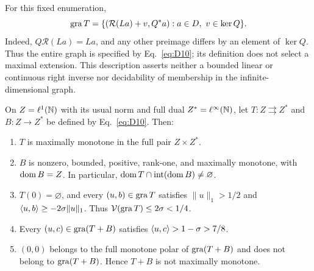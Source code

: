 For this fixed enumeration,
\[
\operatorname{gra} T=\{(\mathcal R(La)+v,Q^*a):a\in D,\ v\in\ker Q\}.
\]
Indeed, $Q\mathcal R(La)=La$, and any other preimage differs by
an element of $\ker Q$. Thus the entire graph is specified by
Eq.~\eqref{eq:D10}; its definition does not select a maximal extension.
This description asserts neither a bounded linear or continuous right
inverse nor decidability of membership in the infinite-dimensional graph.

\label{sec:l1}
\begin{example}\label{thm:L}
On $Z=\ell^1(\mathbb N)$ with its usual norm and full dual $Z^*=\ell^\infty(\mathbb N)$,
let $T:Z\rightrightarrows Z^*$ and $B:Z\to Z^*$ be defined by Eq.~\eqref{eq:D10}.
Then:
\begin{enumerate}
\item $T$ is maximally monotone in the full pair $Z\times Z^*$.
\item $B$ is nonzero, bounded, positive, rank-one, and maximally monotone,
with $\operatorname{dom} B=Z$. In particular,
$\operatorname{dom} T\cap\operatorname{int}(\operatorname{dom} B)\ne\varnothing$.
\item $T(0)=\varnothing$, and every $(u,b)\in\operatorname{gra} T$ satisfies
$\|u\|_1>1/2$ and $\langle u,b\rangle\ge-2\sigma\|u\|_1$.
Thus $\mathcal V(\operatorname{gra} T)\le2\sigma<1/4$.
\item Every $(u,c)\in\operatorname{gra}(T+B)$ satisfies
$\langle u,c\rangle>1-\sigma>7/8$.
\item $(0,0)$ belongs to the full monotone polar of $\operatorname{gra}(T+B)$ and does
not belong to $\operatorname{gra}(T+B)$. Hence $T+B$ is not maximally monotone.
\end{enumerate}
\end{example}
